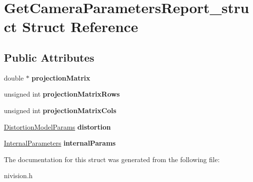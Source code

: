 \hypertarget{structGetCameraParametersReport__struct}{
\section{GetCameraParametersReport\_\-struct Struct Reference}
\label{structGetCameraParametersReport__struct}
}
\subsection*{Public Attributes}
\begin{DoxyCompactItemize}
\item 
\hypertarget{structGetCameraParametersReport__struct_aa0483d48e0da3ee45430ab8f714d2e1b}{
double $\ast$ {\bfseries projectionMatrix}}
\label{structGetCameraParametersReport__struct_aa0483d48e0da3ee45430ab8f714d2e1b}

\item 
\hypertarget{structGetCameraParametersReport__struct_a350441adee45a155af24dbe73b9d037d}{
unsigned int {\bfseries projectionMatrixRows}}
\label{structGetCameraParametersReport__struct_a350441adee45a155af24dbe73b9d037d}

\item 
\hypertarget{structGetCameraParametersReport__struct_a71755b534ca9c948f297679752a5366d}{
unsigned int {\bfseries projectionMatrixCols}}
\label{structGetCameraParametersReport__struct_a71755b534ca9c948f297679752a5366d}

\item 
\hypertarget{structGetCameraParametersReport__struct_a4f5b4cad8769141b2691c01b5027f0fd}{
\hyperlink{structDistortionModelParams__struct}{DistortionModelParams} {\bfseries distortion}}
\label{structGetCameraParametersReport__struct_a4f5b4cad8769141b2691c01b5027f0fd}

\item 
\hypertarget{structGetCameraParametersReport__struct_ae947cb1be8027087e0d839384f375214}{
\hyperlink{structInternalParameters__struct}{InternalParameters} {\bfseries internalParams}}
\label{structGetCameraParametersReport__struct_ae947cb1be8027087e0d839384f375214}

\end{DoxyCompactItemize}


The documentation for this struct was generated from the following file:\begin{DoxyCompactItemize}
\item 
nivision.h\end{DoxyCompactItemize}
